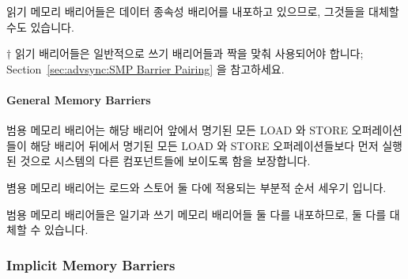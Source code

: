 \begin{enumerate}
읽기 메모리 배리어들은 데이터 종속성 배리어를 내포하고 있으므로, 그것들을
대체할 수도 있습니다.

$\dagger$ 읽기 배리어들은 일반적으로 쓰기 배리어들과 짝을 맞춰 사용되어야
합니다; Section~\ref{sec:advsync:SMP Barrier Pairing} 을 참고하세요.

\paragraph{General Memory Barriers}

범용 메모리 배리어는 해당 배리어 앞에서 명기된 모든 LOAD 와 STORE
오퍼레이션들이 해당 배리어 뒤에서 명기된 모든 LOAD 와 STORE 오퍼레이션들보다
먼저 실행된 것으로 시스템의 다른 컴포넌트들에 보이도록 함을 보장합니다.

볌용 메모리 배리어는 로드와 스토어 둘 다에 적용되는 부분적 순서 세우기 입니다.

범용 메모리 배리어들은 일기과 쓰기 메모리 배리어들 둘 다를 내포하므로, 둘 다를
대체할 수 있습니다.

\subsubsection{Implicit Memory Barriers}


\end{enumerate}
